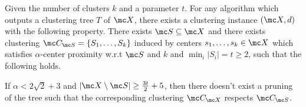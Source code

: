 \documentclass[11pt]{article}
\begin{document}
\begin{theorem}
\label{thm:nosparsealg}
Given the number of clusters $k$ and a parameter $t$. For any algorithm which outputs a clustering tree $T$ of $\mc X$, there exists a clustering instance $(\mc X, d)$ with the following property. There exists $\mc S \subseteq \mc X$ and there exists clustering $\mc C_{\mc S} = \{S_1, \ldots, S_k\}$ induced by centers $s_1, \ldots, s_k \in \mc X$ which satisfies $\alpha$-center proximity w.r.t $\mc S$ and $k$ and $ \min_i|S_i| = t \ge 2$, such that the following holds. 

If $\alpha < 2\sqrt 2 + 3$ and $|\mc X \setminus \mc S| \ge \frac{3t}{2}+5$, then there doesn't exist a pruning of the tree such that the corresponding clustering $\mc C_{\mc X}$ respects $\mc C_{\mc S}$.
\end{theorem}
\end{document}

